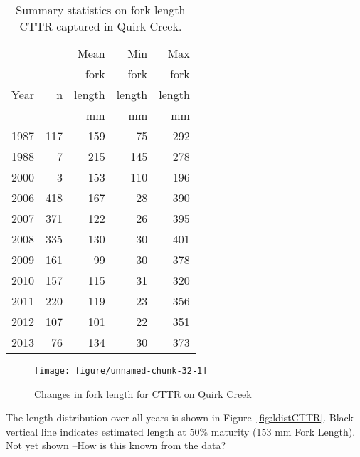 \documentclass[]{article}\usepackage[]{graphicx}\usepackage[]{color}
\makeatletter
\def\maxwidth{ %
  \ifdim\Gin@nat@width>\linewidth
    \linewidth
  \else
    \Gin@nat@width
  \fi
}
\newenvironment{knitrout}{}{} %
\makeatother
\begin{document}
\begin{table}[h]
\centering
\captionsetup{width=.9\linewidth}
\caption{Summary statistics on fork length CTTR captured in Quirk Creek.}
\label{tab:fishsummaryCTTR}
\begin{tabular}{| l | r r r r | } \hline
           &           &  Mean   &  Min     & Max     \\
           &           &  fork   &  fork    & fork    \\
Year       &   n       &  length &  length  & length  \\
           &           & mm      &  mm      &  mm     \\ \hline
1987  &  117  &  159  &  75  &  292 \\ 
1988  &  7  &  215  &  145  &  278 \\ 
2000  &  3  &  153  &  110  &  196 \\ 
2006  &  418  &  167  &  28  &  390 \\ 
2007  &  371  &  122  &  26  &  395 \\ 
2008  &  335  &  130  &  30  &  401 \\ 
2009  &  161  &  99  &  30  &  378 \\ 
2010  &  157  &  115  &  31  &  320 \\ 
2011  &  220  &  119  &  23  &  356 \\ 
2012  &  107  &  101  &  22  &  351 \\ 
2013  &  76  &  134  &  30  &  373 \\ 
\hline 

\end{tabular}
\end{table}

\begin{figure}[h]
\begin{center}
\begin{knitrout}
\color{fgcolor}
\texttt{[image: figure/unnamed-chunk-32-1]} 

\end{knitrout}
\end{center}
\caption{Changes in fork length for CTTR on Quirk Creek}
\label{fig:fishsummaryCTTR}
\end{figure}


\clearpage
The length distribution over all years is shown in Figure~\ref{fig:ldistCTTR}.
Black vertical line indicates estimated length at 50\% maturity (153 mm Fork Length).
{\Large Not yet shown --How is this known from the data? }
\end{document}
